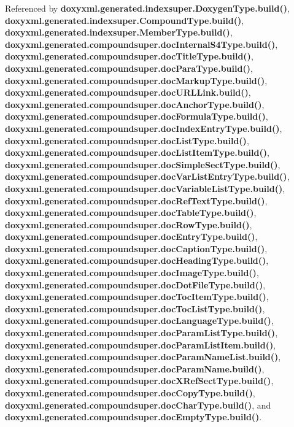 Referenced by {\bf doxyxml.\+generated.\+indexsuper.\+Doxygen\+Type.\+build()}, {\bf doxyxml.\+generated.\+indexsuper.\+Compound\+Type.\+build()}, {\bf doxyxml.\+generated.\+indexsuper.\+Member\+Type.\+build()}, {\bf doxyxml.\+generated.\+compoundsuper.\+doc\+Internal\+S4\+Type.\+build()}, {\bf doxyxml.\+generated.\+compoundsuper.\+doc\+Title\+Type.\+build()}, {\bf doxyxml.\+generated.\+compoundsuper.\+doc\+Para\+Type.\+build()}, {\bf doxyxml.\+generated.\+compoundsuper.\+doc\+Markup\+Type.\+build()}, {\bf doxyxml.\+generated.\+compoundsuper.\+doc\+U\+R\+L\+Link.\+build()}, {\bf doxyxml.\+generated.\+compoundsuper.\+doc\+Anchor\+Type.\+build()}, {\bf doxyxml.\+generated.\+compoundsuper.\+doc\+Formula\+Type.\+build()}, {\bf doxyxml.\+generated.\+compoundsuper.\+doc\+Index\+Entry\+Type.\+build()}, {\bf doxyxml.\+generated.\+compoundsuper.\+doc\+List\+Type.\+build()}, {\bf doxyxml.\+generated.\+compoundsuper.\+doc\+List\+Item\+Type.\+build()}, {\bf doxyxml.\+generated.\+compoundsuper.\+doc\+Simple\+Sect\+Type.\+build()}, {\bf doxyxml.\+generated.\+compoundsuper.\+doc\+Var\+List\+Entry\+Type.\+build()}, {\bf doxyxml.\+generated.\+compoundsuper.\+doc\+Variable\+List\+Type.\+build()}, {\bf doxyxml.\+generated.\+compoundsuper.\+doc\+Ref\+Text\+Type.\+build()}, {\bf doxyxml.\+generated.\+compoundsuper.\+doc\+Table\+Type.\+build()}, {\bf doxyxml.\+generated.\+compoundsuper.\+doc\+Row\+Type.\+build()}, {\bf doxyxml.\+generated.\+compoundsuper.\+doc\+Entry\+Type.\+build()}, {\bf doxyxml.\+generated.\+compoundsuper.\+doc\+Caption\+Type.\+build()}, {\bf doxyxml.\+generated.\+compoundsuper.\+doc\+Heading\+Type.\+build()}, {\bf doxyxml.\+generated.\+compoundsuper.\+doc\+Image\+Type.\+build()}, {\bf doxyxml.\+generated.\+compoundsuper.\+doc\+Dot\+File\+Type.\+build()}, {\bf doxyxml.\+generated.\+compoundsuper.\+doc\+Toc\+Item\+Type.\+build()}, {\bf doxyxml.\+generated.\+compoundsuper.\+doc\+Toc\+List\+Type.\+build()}, {\bf doxyxml.\+generated.\+compoundsuper.\+doc\+Language\+Type.\+build()}, {\bf doxyxml.\+generated.\+compoundsuper.\+doc\+Param\+List\+Type.\+build()}, {\bf doxyxml.\+generated.\+compoundsuper.\+doc\+Param\+List\+Item.\+build()}, {\bf doxyxml.\+generated.\+compoundsuper.\+doc\+Param\+Name\+List.\+build()}, {\bf doxyxml.\+generated.\+compoundsuper.\+doc\+Param\+Name.\+build()}, {\bf doxyxml.\+generated.\+compoundsuper.\+doc\+X\+Ref\+Sect\+Type.\+build()}, {\bf doxyxml.\+generated.\+compoundsuper.\+doc\+Copy\+Type.\+build()}, {\bf doxyxml.\+generated.\+compoundsuper.\+doc\+Char\+Type.\+build()}, and {\bf doxyxml.\+generated.\+compoundsuper.\+doc\+Empty\+Type.\+build()}.



